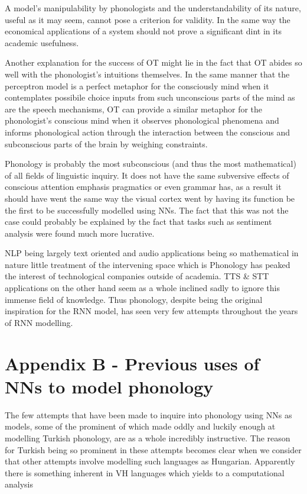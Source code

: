 \documentclass[a4paper,12pt]{article}
\begin{document}
A model's manipulability by phonologists and the understandability of its nature, useful as it may
seem, cannot pose a criterion for validity. In the same way the economical applications of a system
should not prove a significant dint in its academic usefulness.

Another explanation for the success of OT might lie in the fact that OT abides so well with the
phonologist's intuitions themselves. In the same manner that the perceptron model is a perfect metaphor
for the consciously mind when it contemplates possibile choice inputs from such unconscious parts of
the mind as are the speech mechanisms, OT can provide a similar metaphor for the phonologist's
conscious mind when it observes phonological phenomena and informs phonological action through the
interaction between the conscious and subconscious parts of the brain by weighing constraints.

Phonology is probably the most subconscious (and thus the most mathematical) of all fields of
linguistic inquiry. It does not have the same subversive effects of conscious attention emphasis
pragmatics or even grammar has, as a result it should have went the same way the visual cortex went
by having its function be the first to be successfully modelled using NNs. The fact that this was
not the case could probably be explained by the fact that tasks such as sentiment analysis were found
much more lucrative.

NLP being largely text oriented and audio applications being so mathematical in nature little
treatment of the intervening space which is Phonology has peaked the interest of technological
companies outside of academia. TTS \& STT applications on the other hand seem as a whole inclined
sadly to ignore this immense field of knowledge. Thus phonology, despite being the original
inspiration for the RNN model, has seen very few attempts throughout the years of RNN modelling.

\section{Appendix B - Previous uses of NNs to model phonology}

The few attempts that have been made to inquire into phonology using NNs as models, some of the
prominent of which made oddly and luckily enough at modelling Turkish phonology, are as a whole
incredibly instructive. The reason for Turkish being so prominent in these attempts becomes clear
when we consider that other attempts involve modelling such languages as Hungarian. Apparently there
is something inherent in VH languages which yields to a computational analysis
\end{document}
